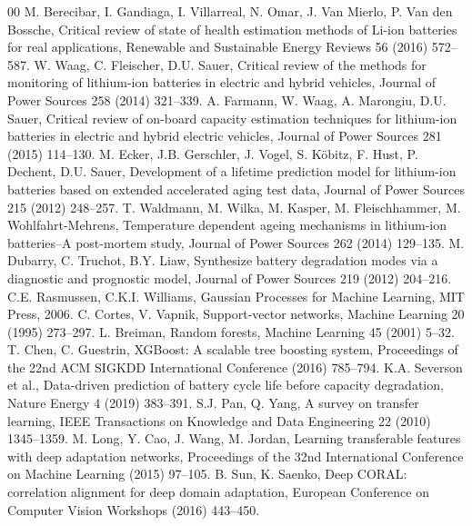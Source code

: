 \setlength{\bibsep}{3pt plus 1pt minus 1pt}
\begin{thebibliography}{00}
 M. Berecibar, I. Gandiaga, I. Villarreal, N. Omar, J. Van Mierlo, P. Van den Bossche, Critical review of state of health estimation methods of Li-ion batteries for real applications, Renewable and Sustainable Energy Reviews 56 (2016) 572--587.
 W. Waag, C. Fleischer, D.U. Sauer, Critical review of the methods for monitoring of lithium-ion batteries in electric and hybrid vehicles, Journal of Power Sources 258 (2014) 321--339.
 A. Farmann, W. Waag, A. Marongiu, D.U. Sauer, Critical review of on-board capacity estimation techniques for lithium-ion batteries in electric and hybrid electric vehicles, Journal of Power Sources 281 (2015) 114--130.
 M. Ecker, J.B. Gerschler, J. Vogel, S. K{\"o}bitz, F. Hust, P. Dechent, D.U. Sauer, Development of a lifetime prediction model for lithium-ion batteries based on extended accelerated aging test data, Journal of Power Sources 215 (2012) 248--257.
 T. Waldmann, M. Wilka, M. Kasper, M. Fleischhammer, M. Wohlfahrt-Mehrens, Temperature dependent ageing mechanisms in lithium-ion batteries--A post-mortem study, Journal of Power Sources 262 (2014) 129--135.
 M. Dubarry, C. Truchot, B.Y. Liaw, Synthesize battery degradation modes via a diagnostic and prognostic model, Journal of Power Sources 219 (2012) 204--216.
 C.E. Rasmussen, C.K.I. Williams, Gaussian Processes for Machine Learning, MIT Press, 2006.
 C. Cortes, V. Vapnik, Support-vector networks, Machine Learning 20 (1995) 273--297.
 L. Breiman, Random forests, Machine Learning 45 (2001) 5--32.
 T. Chen, C. Guestrin, XGBoost: A scalable tree boosting system, Proceedings of the 22nd ACM SIGKDD International Conference (2016) 785--794.
 K.A. Severson et al., Data-driven prediction of battery cycle life before capacity degradation, Nature Energy 4 (2019) 383--391.
 S.J. Pan, Q. Yang, A survey on transfer learning, IEEE Transactions on Knowledge and Data Engineering 22 (2010) 1345--1359.
 M. Long, Y. Cao, J. Wang, M. Jordan, Learning transferable features with deep adaptation networks, Proceedings of the 32nd International Conference on Machine Learning (2015) 97--105.
 B. Sun, K. Saenko, Deep CORAL: correlation alignment for deep domain adaptation, European Conference on Computer Vision Workshops (2016) 443--450.

\end{thebibliography}
